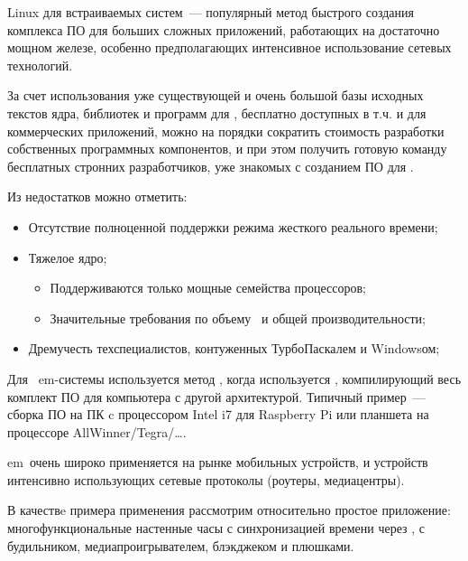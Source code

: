 Linux для встраиваемых систем\ --- популярный метод быстрого создания комплекса
ПО для больших сложных приложений, работающих на достаточно мощном железе,
особенно предполагающих интенсивное использование сетевых технологий.

За счет использования уже существующей и очень большой базы исходных текстов
ядра, библиотек и программ для \linux, бесплатно доступных в т.ч. и для
коммерческих приложений, можно на порядки сократить стоимость разработки
собственных программных компонентов, и при этом получить готовую команду
бесплатных стронних разработчиков, уже знакомых с созданием ПО для \linux.

Из недостатков можно отметить:
\begin{itemize}
  \item Отсутствие полноценной поддержки режима жесткого реального времени;
  \item Тяжелое ядро;
  \begin{itemize}
  \item Поддерживаются только мощные семейства процессоров;
  \item Значительные требования по объему \ram\ и общей производительности;
  \end{itemize}
  \item Дремучесть техспециалистов, контуженных ТурбоПаскалем и
Win\-dows\-ом;
\end{itemize}

Для \ em\linux-системы используется метод
, когда используется
, компилирующий весь комплект ПО для
компьютера с другой архитектурой. Типичный пример\ --- сборка ПО на ПК c
процессором Intel i7 для Raspberry Pi или планшета на процессоре
AllWinner/Tegra/\ldots.

em\linux\ очень широко применяется на рынке мобильных устройств, и устройств интенсивно использующих сетевые протоколы
(роутеры, медиацентры).

В качествe примера применения рассмотрим относительно простое приложение:
многофункциональные настенные часы с синхронизацией времени через \internet, с
будильником, медиапроигрывателем, блэкджеком и плюшками.
